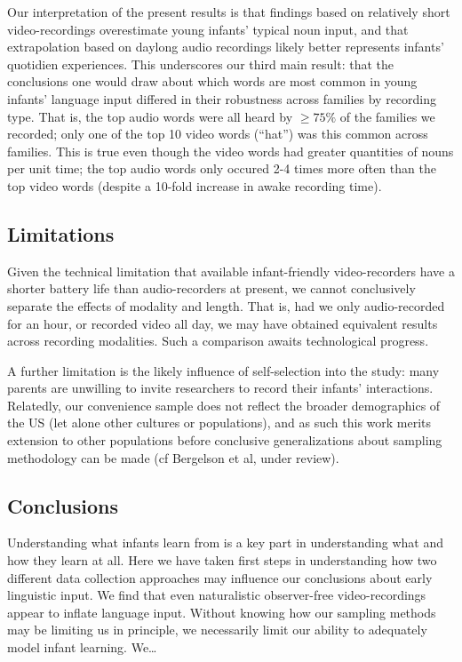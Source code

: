 \documentclass[floatsintext,man]{apa6}
\theoremstyle{definition}
\theoremstyle{definition}
\theoremstyle{definition}
\theoremstyle{remark}
\begin{document}
Our interpretation of the present results is that findings based on
relatively short video-recordings overestimate young infants' typical
noun input, and that extrapolation based on daylong audio recordings
likely better represents infants' quotidien experiences. This
underscores our third main result: that the conclusions one would draw
about which words are most common in young infants' language input
differed in their robustness across families by recording type. That is,
the top audio words were all heard by \(\geq 75\%\) of the families we
recorded; only one of the top 10 video words (\enquote{hat}) was this
common across families. This is true even though the video words had
greater quantities of nouns per unit time; the top audio words only
occured 2-4 times more often than the top video words (despite a 10-fold
increase in awake recording time).

\subsection{Limitations}\label{limitations}

Given the technical limitation that available infant-friendly
video-recorders have a shorter battery life than audio-recorders at
present, we cannot conclusively separate the effects of modality and
length. That is, had we only audio-recorded for an hour, or recorded
video all day, we may have obtained equivalent results across recording
modalities. Such a comparison awaits technological progress.

A further limitation is the likely influence of self-selection into the
study: many parents are unwilling to invite researchers to record their
infants' interactions. Relatedly, our convenience sample does not
reflect the broader demographics of the US (let alone other cultures or
populations), and as such this work merits extension to other
populations before conclusive generalizations about sampling methodology
can be made (cf Bergelson et al, under review).

\subsection{Conclusions}\label{conclusions}

Understanding what infants learn from is a key part in understanding
what and how they learn at all. Here we have taken first steps in
understanding how two different data collection approaches may influence
our conclusions about early linguistic input. We find that even
naturalistic observer-free video-recordings appear to inflate language
input. Without knowing how our sampling methods may be limiting us in
principle, we necessarily limit our ability to adequately model infant
learning. We\ldots{}
\end{document}

